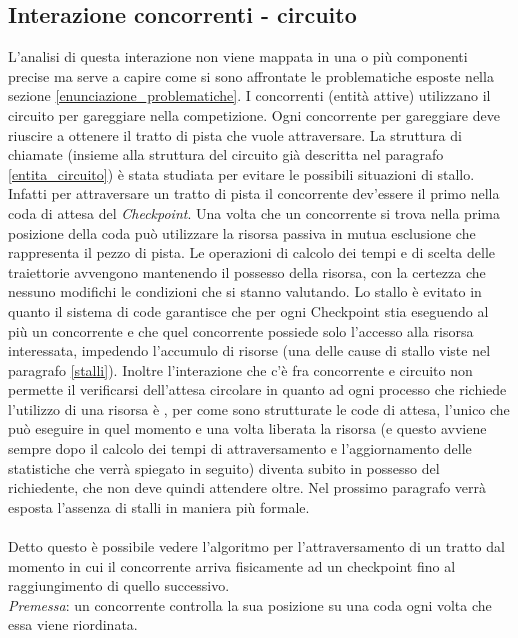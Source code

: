 \subsection{Interazione concorrenti - circuito}
L'analisi di questa interazione non viene mappata in una o più componenti
precise ma serve a capire come si sono affrontate le problematiche esposte nella
sezione \ref{enunciazione_problematiche}. I concorrenti (entità attive)
utilizzano il circuito per gareggiare nella competizione.
Ogni concorrente per gareggiare deve riuscire a ottenere il tratto di pista che
vuole attraversare. La struttura di chiamate (insieme alla struttura del
circuito già descritta nel paragrafo \ref{entita_circuito}) è stata studiata per
evitare le possibili situazioni di stallo. Infatti per attraversare un tratto di
pista il concorrente dev'essere il primo nella coda di attesa del
\emph{Checkpoint}. Una volta che un concorrente si trova nella prima posizione
della coda può utilizzare la risorsa passiva in mutua esclusione che rappresenta
il pezzo di pista. Le operazioni di calcolo dei tempi e di scelta delle
traiettorie avvengono mantenendo il possesso della risorsa, con la certezza che
nessuno modifichi le condizioni che si stanno valutando. Lo stallo è evitato in
quanto il sistema di code garantisce che per ogni Checkpoint stia eseguendo al
più un concorrente e che quel concorrente possiede solo l'accesso alla risorsa
interessata, impedendo l'accumulo di risorse (una delle cause di stallo viste
nel paragrafo \ref{stalli}). Inoltre l'interazione che c'è fra concorrente e
circuito non permette il verificarsi dell'attesa circolare in quanto ad ogni
processo che richiede l'utilizzo di una risorsa è , per come sono strutturate le
code di attesa, l'unico che può eseguire in quel momento e una volta liberata la
risorsa (e questo avviene sempre dopo il calcolo dei tempi di attraversamento e
l'aggiornamento delle statistiche che verrà spiegato in seguito) diventa subito
in possesso del richiedente, che non deve quindi attendere oltre. 
Nel prossimo paragrafo verrà esposta l'assenza di stalli in maniera più formale.
\\\\
Detto questo \`{e} possibile vedere l'algoritmo per l'attraversamento di un
tratto dal momento in cui il concorrente arriva 
fisicamente ad un checkpoint
fino al raggiungimento di quello successivo.\\
\emph{Premessa}: un concorrente controlla la sua posizione su una coda ogni
volta che essa viene riordinata.\\

